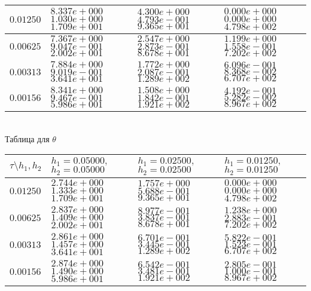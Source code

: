 \documentclass[a4paper]{article}
\theoremstyle{definition}
\numberwithin{equation}{section}
\begin{document}
\begin{center}
\begin{tabular}{|p{0.8in}|p{1.2in}|p{1.2in}|p{1.2in}|}
$0.01250$ & $8.337e+000$ $1.030e+000$ $1.709e+001$ &$4.300e+000$ $4.793e-001$ $9.365e+001$ &$0.000e+000$ $0.000e+000$ $4.798e+002$  \\ \hline
$0.00625$ & $7.367e+000$ $9.047e-001$ $2.002e+001$ &$2.547e+000$ $2.873e-001$ $8.678e+001$ &$1.199e+000$ $1.558e-001$ $7.202e+002$  \\ \hline
$0.00313$ & $7.884e+000$ $9.019e-001$ $3.641e+001$ &$1.772e+000$ $2.087e-001$ $1.289e+002$ &$6.096e-001$ $8.368e-002$ $6.707e+002$  \\ \hline
$0.00156$ & $8.341e+000$ $9.467e-001$ $5.986e+001$ &$1.508e+000$ $1.842e-001$ $1.921e+002$ &$4.192e-001$ $5.282e-002$ $8.967e+002$  \\ \hline
\end{tabular}\\[20pt]
Таблица для $\theta$

\begin{tabular}{|p{0.8in}|p{1.2in}|p{1.2in}|p{1.2in}|} \hline
$\tau\setminus h_1, h_2$ & $h_1=0.05000 ,$ $h_2=0.05000$& $h_1=0.02500 ,$ $h_2=0.02500$& $h_1=0.01250 ,$ $h_2=0.01250$ \\ \hline

$0.01250$ & $2.744e+000$ $1.333e+000$ $1.709e+001$ &$1.757e+000$ $5.688e-001$ $9.365e+001$ &$0.000e+000$ $0.000e+000$ $4.798e+002$  \\ \hline
$0.00625$ & $2.837e+000$ $1.409e+000$ $2.002e+001$ &$8.977e-001$ $3.837e-001$ $8.678e+001$ &$1.238e+000$ $2.883e-001$ $7.202e+002$  \\ \hline
$0.00313$ & $2.861e+000$ $1.457e+000$ $3.641e+001$ &$6.701e-001$ $3.445e-001$ $1.289e+002$ &$5.822e-001$ $1.523e-001$ $6.707e+002$  \\ \hline
$0.00156$ & $2.874e+000$ $1.490e+000$ $5.986e+001$ &$6.542e-001$ $3.481e-001$ $1.921e+002$ &$2.805e-001$ $1.000e-001$ $8.967e+002$  \\ \hline
\end{tabular}\\[20pt]
\end{center}
\newpage
\end{document}
